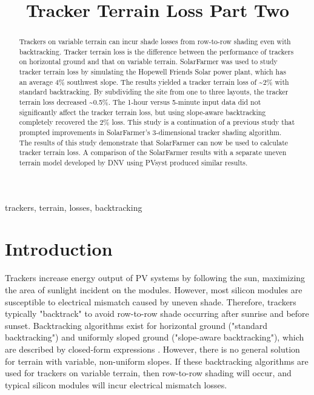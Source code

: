 \documentclass[conference]{IEEEtran}
\begin{document}
\title{Tracker Terrain Loss Part Two}

\author{
	}

\maketitle

\begin{abstract}
Trackers on variable terrain can incur shade losses from row-to-row shading even with backtracking. Tracker terrain loss is the difference between the performance of trackers on horizontal ground and that on variable terrain. SolarFarmer was used to study tracker terrain loss by simulating the Hopewell Friends Solar power plant, which has an average 4\% southwest slope. The results yielded a tracker terrain loss of \textasciitilde2\% with standard backtracking. By subdividing the site from one to three layouts, the tracker terrain loss decreased \textasciitilde0.5\%. The 1-hour versus 5-minute input data did not significantly affect the tracker terrain loss, but using slope-aware backtracking completely recovered the 2\% loss. This study is a continuation of a previous study that prompted improvements in SolarFarmer's 3-dimensional tracker shading algorithm. The results of this study demonstrate that SolarFarmer can now be used to calculate tracker terrain loss. A comparison of the SolarFarmer results with a separate uneven terrain model developed by DNV using PVsyst produced similar results.
\end{abstract}

\begin{IEEEkeywords}
trackers, terrain, losses, backtracking
\end{IEEEkeywords}

\section{Introduction}
Trackers increase energy output of PV systems by following the sun, maximizing the area of sunlight incident on the modules. However, most silicon modules are susceptible to electrical mismatch caused by uneven shade. Therefore, trackers typically "backtrack" to avoid  row-to-row shade occurring after sunrise and before sunset. Backtracking algorithms exist for horizontal ground ("standard backtracking") and uniformly sloped ground ("slope-aware backtracking"), which are described by closed-form expressions \cite{Marion2013,Anderson2020}. However, there is no general solution for terrain with variable, non-uniform slopes. If these backtracking algorithms are used for trackers on variable terrain, then row-to-row shading will occur, and typical silicon modules will incur electrical mismatch losses. 
\end{document}
